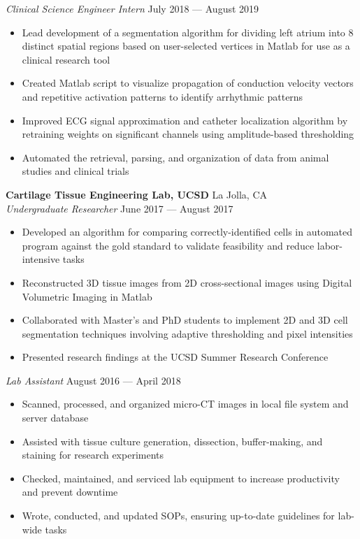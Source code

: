 \documentclass{article}
\begin{document}
\textit{Clinical Science Engineer Intern} \hfill July 2018 --- August 2019\\
\vspace{-2mm}
\begin{itemize} \itemsep 0.05pt
	\item Lead development of a segmentation algorithm for dividing left atrium into 8 distinct spatial regions based on user-selected vertices in Matlab for use as a clinical research tool
	\item Created Matlab script to visualize propagation of conduction velocity vectors and repetitive activation patterns to identify arrhythmic patterns
	\item Improved ECG signal approximation and catheter localization algorithm by retraining weights on significant channels using amplitude-based thresholding
	\item Automated the retrieval, parsing, and organization of data from animal studies and clinical trials
\end{itemize}


\textbf{Cartilage Tissue Engineering Lab, UCSD} \hfill La Jolla, CA\\
\textit{Undergraduate Researcher} \hfill June 2017 --- August 2017\\
\vspace{-2mm}
\begin{itemize} \itemsep 0.05pt
	\item Developed an algorithm for comparing correctly-identified cells in automated program against the gold standard to validate feasibility and reduce labor-intensive tasks
	\item Reconstructed 3D tissue images from 2D cross-sectional images using Digital Volumetric Imaging in Matlab
	\item Collaborated with Master’s and PhD students to implement 2D and 3D cell segmentation techniques involving adaptive thresholding and pixel intensities
	\item Presented research findings at the UCSD Summer Research Conference
\end{itemize}


\textit{Lab Assistant} \hfill August 2016 --- April 2018\\
\vspace{-2mm}
\begin{itemize} \itemsep 0.05pt
	\item Scanned, processed, and organized micro-CT images in local file system and server database
	\item Assisted with tissue culture generation, dissection, buffer-making, and staining for research experiments
	\item Checked, maintained, and serviced lab equipment to increase productivity and prevent downtime
	\item Wrote, conducted, and updated SOPs, ensuring up-to-date guidelines for lab-wide tasks
\end{itemize}
\end{document}
